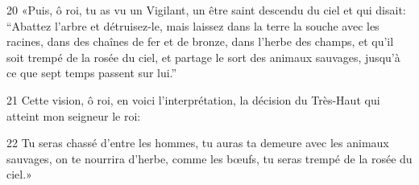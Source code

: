 
20 «Puis, ô roi, tu as vu un Vigilant, un être saint descendu du ciel et qui disait: “Abattez l’arbre et détruisez-le, mais laissez dans la terre la souche avec les racines, dans des chaînes de fer et de bronze, dans l’herbe des champs, et qu’il soit trempé de la rosée du ciel, et partage le sort des animaux sauvages, jusqu’à ce que sept temps passent sur lui.”

21 Cette vision, ô roi, en voici l’interprétation, la décision du Très-Haut qui atteint mon seigneur le roi:

22 Tu seras chassé d’entre les hommes, tu auras ta demeure avec les animaux sauvages, on te nourrira d’herbe, comme les bœufs, tu seras trempé de la rosée du ciel.»

